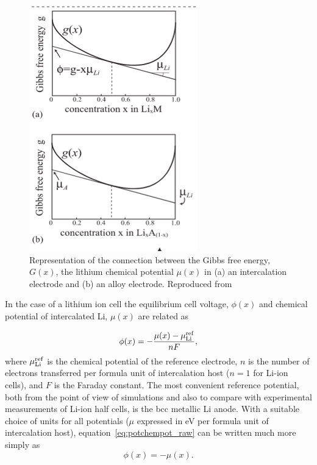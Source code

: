 \documentclass[journal=jacsat,manuscript=article]{achemso}
\begin{document}
\begin{figure}
    \centering
    \includegraphics[scale=2]{figures/thermodynamics_vanderven.png}
    \caption{Representation of the connection between the Gibbs free energy, $G(x)$, the  lithium chemical potential $\mu(x)$ in (a) an intercalation electrode and (b) an alloy electrode. Reproduced from \cite{VanderVen2020}}
    \label{fig:vanderven_thermodynamics}
\end{figure}

In the case of a lithium ion cell the equilibrium cell voltage, $\phi(x)$ and chemical potential of intercalated Li, $\mu(x)$ are related as

\begin{equation}
    \phi(x) = -\frac{\mu(x) - \mu_{\rm{Li}}^{\rm{ref}}}{nF},
    \label{eq:potchempot_raw}
\end{equation}
where $\mu_{\rm{Li}}^{\rm{ref}}$ is the chemical potential of the reference electrode, $n$ is the number of electrons transferred per formula unit of intercalation host ($n =1$ for Li-ion cells), and $F$ is the Faraday constant. The most convenient reference potential, both from the point of view of simulations and also to compare with experimental measurements of Li-ion half cells, is the bcc metallic Li anode.  With a suitable choice of units for all potentials ($\mu$ expressed in eV per formula unit of intercalation host), equation~\ref{eq:potchempot_raw} can be written much more simply as \cite{CEDER1999131}
\begin{equation}
    \phi(x) = -\mu(x).
    \label{eq:potchempot}
\end{equation}
\end{document}
